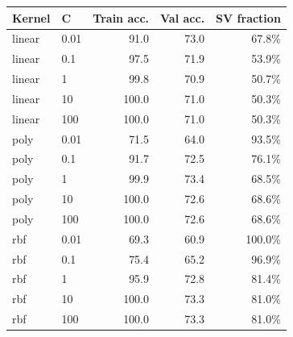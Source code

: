 \begin{tabular}{llrrr}
\hline
Kernel & C & Train acc. & Val acc. & SV fraction \\
\hline
linear & 0.01 & 91.0 & 73.0 & 67.8\% \\
linear & 0.1 & 97.5 & 71.9 & 53.9\% \\
linear & 1 & 99.8 & 70.9 & 50.7\% \\
linear & 10 & 100.0 & 71.0 & 50.3\% \\
linear & 100 & 100.0 & 71.0 & 50.3\% \\
poly & 0.01 & 71.5 & 64.0 & 93.5\% \\
poly & 0.1 & 91.7 & 72.5 & 76.1\% \\
poly & 1 & 99.9 & 73.4 & 68.5\% \\
poly & 10 & 100.0 & 72.6 & 68.6\% \\
poly & 100 & 100.0 & 72.6 & 68.6\% \\
rbf & 0.01 & 69.3 & 60.9 & 100.0\% \\
rbf & 0.1 & 75.4 & 65.2 & 96.9\% \\
rbf & 1 & 95.9 & 72.8 & 81.4\% \\
rbf & 10 & 100.0 & 73.3 & 81.0\% \\
rbf & 100 & 100.0 & 73.3 & 81.0\% \\
\hline
\end{tabular}
